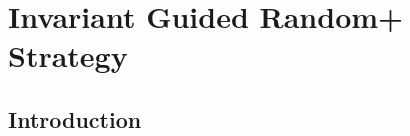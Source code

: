 \chapter{Invariant Guided Random+ Strategy}
\label{chap:IGR+S}

\section{Introduction}\label{sec:intro5}






